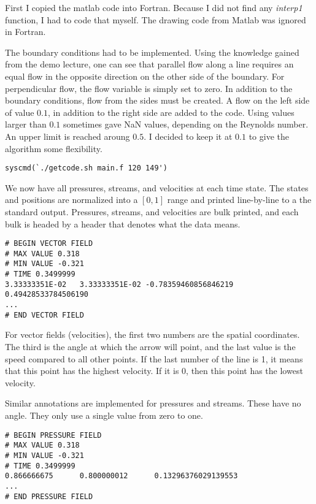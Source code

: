 \documentclass[listof=totoc]{report}
\begin{document}
First I copied the matlab code into Fortran. Because I did not find any \emph{interp1} function, I had to code that myself. The drawing code from Matlab was ignored in Fortran.

The boundary conditions had to be implemented. Using the knowledge gained from the demo lecture, one can see that parallel flow along a line requires an equal flow in the opposite direction on the other side of the boundary. For perpendicular flow, the flow variable is simply set to zero. In addition to the boundary conditions, flow from the sides must be created. A flow on the left side of value $0.1$, in addition to the right side are added to the code.
Using values larger than $0.1$ sometimes gave NaN values, depending on the Reynolds number. An upper limit is reached aroung $0.5$. I decided to keep it at $0.1$ to give the algorithm some flexibility.

\begin{verbatim}
syscmd(`./getcode.sh main.f 120 149')
\end{verbatim}

We now have all pressures, streams, and velocities at each time state. The states and positions are normalized into a $[0, 1]$ range and printed line-by-line to a the standard output. Pressures, streams, and velocities are bulk printed, and each bulk is headed by a header that denotes what the data means.

\begin{verbatim}
# BEGIN VECTOR FIELD
# MAX VALUE 0.318
# MIN VALUE -0.321
# TIME 0.3499999
3.33333351E-02   3.33333351E-02 -0.78359460856846219       0.49428533784506190
...
# END VECTOR FIELD
\end{verbatim}

For vector fields (velocities), the first two numbers are the spatial coordinates. The third is the angle at which the arrow will point, and the last value is the speed compared to all other points. If the last number of the line is 1, it means that this point has the highest velocity. If it is 0, then this point has the lowest velocity.

Similar annotations are implemented for pressures and streams. These have no angle. They only use a single value from zero to one.

\begin{verbatim}
# BEGIN PRESSURE FIELD
# MAX VALUE 0.318
# MIN VALUE -0.321
# TIME 0.3499999
0.866666675      0.800000012      0.13296376029139553
...
# END PRESSURE FIELD
\end{verbatim}
\end{document}
